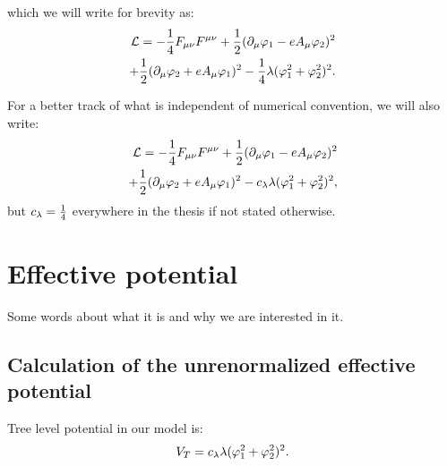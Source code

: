 which we will write for brevity as:
\begin{align}
\mathcal{L} = -\frac{1}{4}F_{\mu\nu}F^{\mu\nu}+ 
\frac{1}{2}(\partial_\mu\varphi_1 - eA_\mu\varphi_2)^2\\
+\frac{1}{2}(\partial_\mu\varphi_2+eA_\mu\varphi_1)^2
-\frac{1}{4}\lambda(\varphi_1^2+\varphi_2^2)^2. \notag
\end{align}


For a better track of what is independent of numerical convention, we will also write:
\begin{align}\label{scalar_electrodynamics}
\mathcal{L} = -\frac{1}{4}F_{\mu\nu}F^{\mu\nu}+ 
\frac{1}{2}(\partial_\mu\varphi_1 - eA_\mu\varphi_2)^2\\
+\frac{1}{2}(\partial_\mu\varphi_2+eA_\mu\varphi_1)^2
-c_\lambda\lambda(\varphi_1^2+\varphi_2^2)^2, \notag
\end{align}
but $c_\lambda = \frac{1}{4}$ everywhere in the thesis if not stated otherwise.
\section{Effective potential}
\todo{}
Some words about what it is and why we are interested in it.


\subsection{Calculation of the unrenormalized effective potential}

Tree level potential in our model is:
\begin{equation}
V_T = c_\lambda\lambda(\varphi_1^2+\varphi_2^2)^2.
\end{equation}


